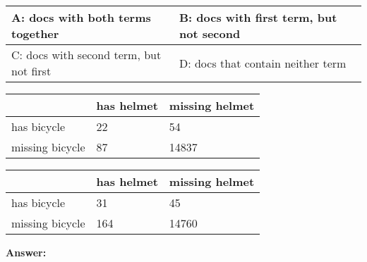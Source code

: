 \documentclass[11pt]{article}
\begin{document}
\begin{enumerate}
        \begin{table}[ht]
            \footnotesize
            \begin{tabular}[t]{|a{1.6cm}|a{1.6cm}|}
                \hline
                A: docs with both terms together & B: docs with first term, but not second
                \\ \hline
                C: docs with second term, but not first & D: docs that contain neither term
                \\ \hline
            \end{tabular}
            \hfill
            \begin{tabular}[t]{|M{1.15cm}|M{1.15cm}|M{1.15cm}|}
                \hline
                & has helmet & missing helmet
                \\ \hline
                has bicycle & 22 & 54
                \\ \hline
                missing bicycle & 87 & 14837
                \\ \hline
            \end{tabular}
            \hfill
            \begin{tabular}[t]{|M{1.15cm}|M{1.15cm}|M{1.15cm}|}
                \hline
                & has helmet & missing helmet
                \\ \hline
                has bicycle & 31 & 45
                \\ \hline
                missing bicycle & 164 & 14760
                \\ \hline
            \end{tabular}
        \end{table}

        \textbf{Answer:}

    \end{enumerate}
\end{document}
